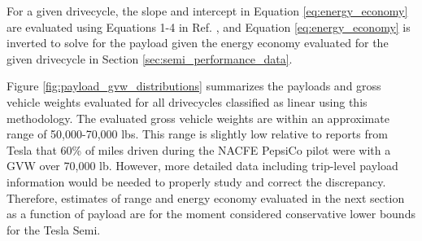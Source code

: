 For a given drivecycle, the slope and intercept in Equation \ref{eq:energy_economy} are evaluated using Equations 1-4 in Ref. \cite{Sader_2023}, and Equation \ref{eq:energy_economy} is inverted to solve for the payload given the energy economy evaluated for the given drivecycle in Section \ref{sec:semi_performance_data}. 

Figure \ref{fig:payload_gvw_distributions} summarizes the payloads and gross vehicle weights evaluated for all drivecycles classified as linear using this methodology. The evaluated gross vehicle weights are within an approximate range of 50,000-70,000 lbs. This range is slightly low relative to reports from Tesla \cite{teslarati_semi_pepsico} that 60\% of miles driven during the NACFE PepsiCo pilot were with a GVW over 70,000 lb. However, more detailed data including trip-level payload information would be needed to properly study and correct the discrepancy. Therefore, estimates of range and energy economy evaluated in the next section as a function of payload are for the moment considered conservative lower bounds for the Tesla Semi. 

